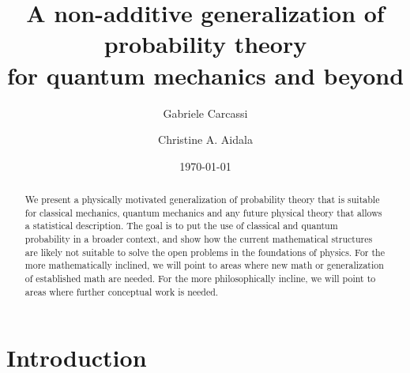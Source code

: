 \documentclass[10pt,twocolumn, nofootinbib]{revtex4-2}
\begin{document}
\title{A non-additive generalization of probability theory \\for quantum mechanics and beyond}
\author{Gabriele Carcassi}
\author{Christine A. Aidala}

\date{\today}


\begin{abstract}
	We present a physically motivated generalization of probability theory that is suitable for classical mechanics, quantum mechanics and any future physical theory that allows a statistical description. The goal is to put the use of classical and quantum probability in a broader context, and show how the current mathematical structures are likely not suitable to solve the open problems in the foundations of physics. For the more mathematically inclined, we will point to areas where new math or generalization of established math are needed. For the more philosophically incline, we will point to areas where further conceptual work is needed.
	
	
\end{abstract}

\maketitle

\section{Introduction}
\end{document}
